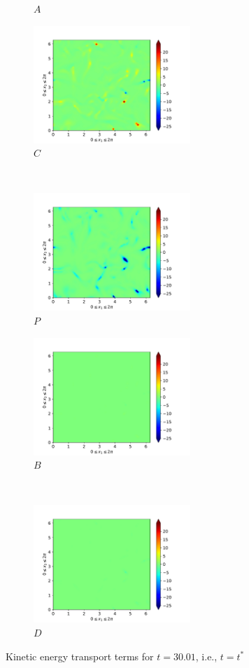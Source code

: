 \begin{figure}[H]
\begin{subfigure}{0.45\textwidth}
        \caption{$A$}
    \end{subfigure}
    \newline
    \begin{subfigure}{0.45\textwidth}
        \includegraphics[height=1.75in]{media/run-cds-65/C-ke-1340}
        \caption{$C$}
    \end{subfigure}
    ~
    \begin{subfigure}{0.45\textwidth}
        \includegraphics[height=1.75in]{media/run-cds-65/P-ke-1340}
        \caption{$P$}
    \end{subfigure}
    \newline
    \begin{subfigure}{0.45\textwidth}
        \includegraphics[height=1.75in]{media/run-cds-65/B-ke-1340}
        \caption{$B$}
    \end{subfigure}
    ~
    \begin{subfigure}{0.45\textwidth}
        \includegraphics[height=1.75in]{media/run-cds-65/D-ke-1340}
        \caption{$D$}
    \end{subfigure}
    \caption{Kinetic energy transport terms for $t=30.01$, i.e., $t=t^{\ast} $}
\end{figure}
